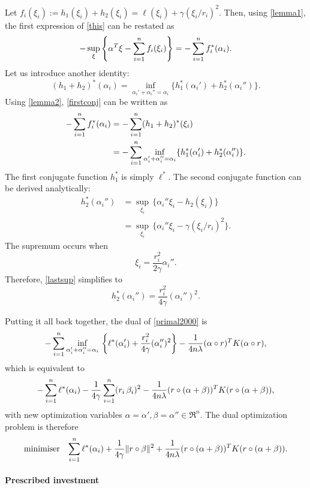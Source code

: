 Let $f_i(\xi_i) := h_1(\xi_i)+ h_2(\xi_i) = \ell(\xi_i) + \gamma(\xi_i/r_i)^2$. Then, using \eqref{lemma1},
the first expression of \eqref{this} can be restated as
\begin{equation}
  \label{firstconj}
  -\sup_\xi\left\{\alpha^T \xi - \sum_{i=1}^n f_i(\xi_i)\right\} = -\sum_{i=1}^n f_i^*(\alpha_i).
\end{equation}
Let us introduce another identity:
\begin{equation}
  \label{lemma2}
  (h_1+h_2)^*(\alpha_i) = \inf_{\alpha_i'+\alpha_i''=\alpha_i} \{h_1^*(\alpha_i') + h_2^*(\alpha_i'')\}.
\end{equation}
Using \eqref{lemma2}, \eqref{firstconj} can be written as
\begin{align}
  -\sum_{i=1}^n f_i^*(\alpha_i) &= -\sum_{i=1}^n (h_1+h_2)^*(\xi_i)\\
                    &= -\sum_{i=1}^n \inf_{\alpha_i'+\alpha_i''=\alpha_i} \{h_1^*(\alpha_i') + h_2^*(\alpha_i'')\}.
\end{align}
The first conjugate function $h_1^*$ is simply $\ell^*$. The second conjugate function can be
derived analytically:
\begin{align}
  h_2^*(\alpha_i'') &= \sup_{\xi_i}\,\{\alpha_i''\xi_i - h_2(\xi_i)\}\\
               &= \sup_{\xi_i}\,\{\alpha_i''\xi_i - \gamma(\xi_i/r_i)^2\}\label{lastsup}.
\end{align}
The supremum occurs when
\begin{equation}
  \label{supconj}
  \xi_i = \frac{r_i^2}{2\gamma}\alpha_i''.
\end{equation}
Therefore, \eqref{lastsup} simplifies to
\begin{equation}
  h_2^*(\alpha_i'') = \frac{r_i^2}{4\gamma}(\alpha_i'')^2.
\end{equation}

Putting it all back together, the dual of \eqref{primal2000} is
\begin{equation}
  -\sum_{i=1}^n \inf_{\alpha_i'+\alpha_i''=\alpha_i}\,\left\{\ell^*(\alpha_i') + \frac{r_i^2}{4\gamma}(\alpha_i'')^2\right\}  - \frac{1}{4n\lambda} (\alpha \circ r)^TK(\alpha \circ r),
\end{equation}
which is equivalent to
\begin{equation}
  -\sum_{i=1}^n \ell^*(\alpha_i) - \frac{1}{4\gamma}\sum_{i=1}^n (r_i\,\beta_i)^2 - \frac{1}{4n\lambda}(r \circ (\alpha+\beta))^TK(r \circ (\alpha+\beta)),
\end{equation}
with new optimization variables $\alpha=\alpha',\beta=\alpha'' \in \Re^n$. The dual optimization problem is
therefore
\begin{equation}
  \begin{array}{ll}\operatorname*{minimiser} & \displaystyle{\sum_{i=1}^n\ell^*(\alpha_i) + \frac{1}{4\gamma}\|r\circ\beta\|^2 + \frac{1}{4n\lambda}(r \circ (\alpha+\beta))^TK(r \circ (\alpha+\beta)).}\end{array}
\end{equation}


\paragraph{Prescribed investment}
\todo{}


